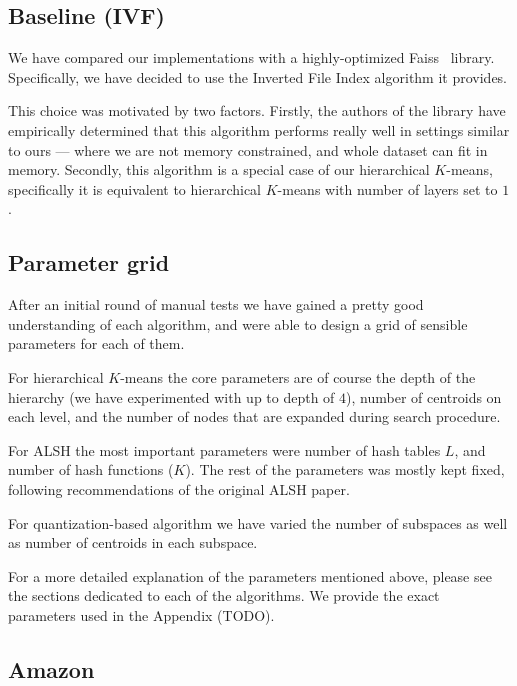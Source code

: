     \subsection{Baseline (IVF)}\label{subsec:baselineivf}

        We have compared our implementations with a highly-optimized Faiss~\cite{faiss} library.
        Specifically, we have decided to use the Inverted File Index algorithm it provides.

        This choice was motivated by two factors.
        Firstly, the authors of the library have empirically determined that this algorithm performs
        really well in settings similar to ours --- where we are not memory constrained, and whole dataset
        can fit in memory.
        Secondly, this algorithm is a special case of our hierarchical $K$-means, specifically
        it is equivalent to hierarchical $K$-means with number of layers set to $1$.

    \subsection{Parameter grid}\label{subsec:parameterGrid}

        After an initial round of manual tests we have gained a pretty good understanding of
        each algorithm, and were able to design a grid of sensible parameters for each of them.

        For hierarchical $K$-means the core parameters are of course the depth of the hierarchy
        (we have experimented with up to depth of $4$), number of centroids on each level,
        and the number of nodes that are expanded during search procedure.

        For ALSH the most important parameters were number of hash tables $L$,
        and number of hash functions ($K$). The rest of the parameters was mostly kept fixed, following
        recommendations of the original ALSH paper.

        For quantization-based algorithm we have varied the number of subspaces as well as number of centroids
        in each subspace.

        For a more detailed explanation of the parameters mentioned above, please see the sections
        dedicated to each of the algorithms.
        We provide the exact parameters used in the Appendix (TODO).

    \subsection{Amazon}

